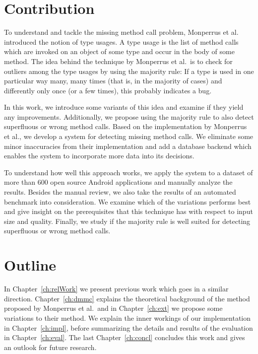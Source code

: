\section{Contribution}

To understand and tackle the missing method call problem, Monperrus et al.~\cite{monperrus2010detecting}\cite{monperrus2013detecting} introduced the notion of type usages.
A type usage is the list of method calls which are invoked on an object of some type and occur in the body of some method.
The idea behind the technique by Monperrus et al.\ is to check for outliers among the type usages by using the majority rule:
If a type is used in one particular way many, many times (that is, in the majority of cases) and differently only once (or a few times), this probably indicates a bug.

In this work, we introduce some variants of this idea and examine if they yield any improvements.
Additionally, we propose using the majority rule to also detect superfluous or wrong method calls.
Based on the implementation by Monperrus et al., we develop a system for detecting missing method calls.
We eliminate some minor inaccuracies from their implementation and add a database backend which enables the system to incorporate more data into its decisions.

To understand how well this approach works, we apply the system to a dataset of more than 600 open source Android applications and manually analyze the results.
Besides the manual review, we also take the results of an automated benchmark into consideration.
We examine which of the variations performs best and give insight on the prerequisites that this technique has with respect to input size and quality.
Finally, we study if the majority rule is well suited for detecting superfluous or wrong method calls.


\section{Outline}

In Chapter~\ref{ch:relWork} we present previous work which goes in a similar direction.
Chapter~\ref{ch:dmmc} explains the theoretical background of the method proposed by Monperrus et al.\ and in Chapter~\ref{ch:ext} we propose some variations to their method.
We explain the inner workings of our implementation in Chapter~\ref{ch:impl}, before summarizing the details and results of the evaluation in Chapter~\ref{ch:eval}.
The last Chapter~\ref{ch:concl} concludes this work and gives an outlook for future research.

